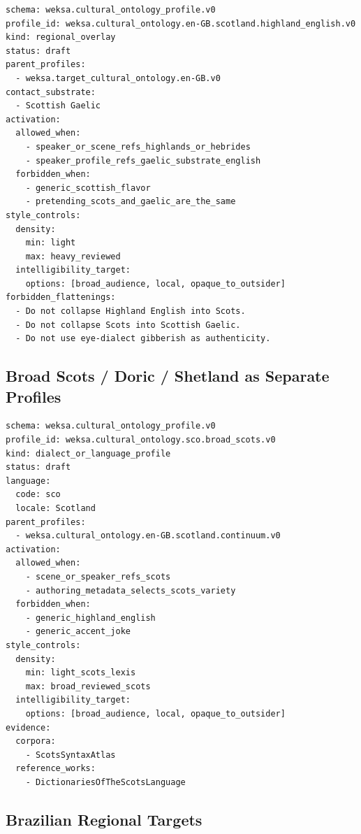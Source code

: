 \documentclass[11pt]{article}
\begin{document}
\begin{lstlisting}[basicstyle=\ttfamily\small,breaklines=true]
schema: weksa.cultural_ontology_profile.v0
profile_id: weksa.cultural_ontology.en-GB.scotland.highland_english.v0
kind: regional_overlay
status: draft
parent_profiles:
  - weksa.target_cultural_ontology.en-GB.v0
contact_substrate:
  - Scottish Gaelic
activation:
  allowed_when:
    - speaker_or_scene_refs_highlands_or_hebrides
    - speaker_profile_refs_gaelic_substrate_english
  forbidden_when:
    - generic_scottish_flavor
    - pretending_scots_and_gaelic_are_the_same
style_controls:
  density:
    min: light
    max: heavy_reviewed
  intelligibility_target:
    options: [broad_audience, local, opaque_to_outsider]
forbidden_flattenings:
  - Do not collapse Highland English into Scots.
  - Do not collapse Scots into Scottish Gaelic.
  - Do not use eye-dialect gibberish as authenticity.
\end{lstlisting}

\subsection{Broad Scots / Doric / Shetland as Separate Profiles}

\begin{lstlisting}[basicstyle=\ttfamily\small,breaklines=true]
schema: weksa.cultural_ontology_profile.v0
profile_id: weksa.cultural_ontology.sco.broad_scots.v0
kind: dialect_or_language_profile
status: draft
language:
  code: sco
  locale: Scotland
parent_profiles:
  - weksa.cultural_ontology.en-GB.scotland.continuum.v0
activation:
  allowed_when:
    - scene_or_speaker_refs_scots
    - authoring_metadata_selects_scots_variety
  forbidden_when:
    - generic_highland_english
    - generic_accent_joke
style_controls:
  density:
    min: light_scots_lexis
    max: broad_reviewed_scots
  intelligibility_target:
    options: [broad_audience, local, opaque_to_outsider]
evidence:
  corpora:
    - ScotsSyntaxAtlas
  reference_works:
    - DictionariesOfTheScotsLanguage
\end{lstlisting}

\subsection{Brazilian Regional Targets}
\end{document}
